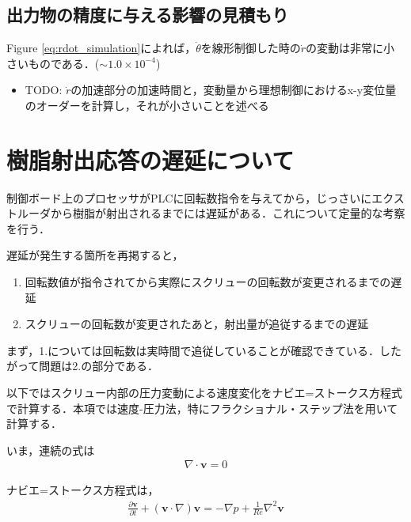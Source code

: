 \documentclass[twocolumn,oneside,a4paper]{article}
\begin{document}
\subsection{出力物の精度に与える影響の見積もり}
Figure \ref{eq:rdot_simulation}によれば，$\dot{\theta}$を線形制御した時の$\dot r$の変動は非常に小さいものである．($\sim 1.0 \times 10^{-4}$)

\begin{itemize}
     \item TODO: $\dot r$の加速部分の加速時間と，変動量から理想制御におけるx-y変位量のオーダーを計算し，それが小さいことを述べる
\end{itemize}




\section{樹脂射出応答の遅延について}
制御ボード上のプロセッサがPLCに回転数指令を与えてから，じっさいにエクストルーダから樹脂が射出されるまでには遅延がある．これについて定量的な考察を行う．

遅延が発生する箇所を再掲すると，
\begin{enumerate}
    \item 回転数値が指令されてから実際にスクリューの回転数が変更されるまでの遅延
    \item スクリューの回転数が変更されたあと，射出量が追従するまでの遅延
\end{enumerate}

まず，1.については回転数は実時間で追従していることが確認できている．したがって問題は2.の部分である．

以下ではスクリュー内部の圧力変動による速度変化をナビエ=ストークス方程式で計算する．本項では速度-圧力法，特にフラクショナル・ステップ法\cite{nagare,ranryu}を用いて計算する．

いま，連続の式は
\begin{eqnarray}\label{eq:continuous}
     \nabla \cdot \bm{v} = 0
\end{eqnarray}

ナビエ=ストークス方程式は，
\begin{eqnarray}\label{eq:ns}
     \frac{\partial \bm{v}}{\partial t} + (\bm{v}\cdot \nabla)\bm{v} = -\nabla p + \frac{1}{Re} \nabla^2 \bm{v}
\end{eqnarray}
\end{document}
